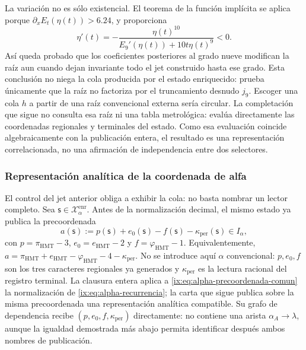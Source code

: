 La variación no es sólo existencial. El teorema de la función implícita se
aplica porque \(\partial_xE_t(\eta(t))>6.24\), y proporciona
\begin{equation}
 \eta'(t)=-
 \frac{\eta(t)^{10}}
 {E_9'(\eta(t))+10t\eta(t)^9}<0.
 \label{ix:eq:alpha-variacion-raiz-prolongacion}
\end{equation}
Así queda probado que los coeficientes posteriores al grado nueve modifican
la raíz aun cuando dejan invariante todo el jet construido hasta ese grado.
Esta conclusión no niega la cola producida por el estado enriquecido: prueba
únicamente que la raíz no factoriza por el truncamiento desnudo
\(j_9\). Escoger una cola \(h\) a partir de una raíz convencional externa
sería circular. La completación que sigue no consulta esa raíz ni una tabla
metrológica: evalúa directamente las coordenadas regionales y terminales del
estado. Como esa evaluación coincide algebraicamente con la publicación
entera, el resultado es una representación correlacionada, no una afirmación
de independencia entre dos selectores.


\subsubsection{Representación analítica de la coordenada de alfa}
\label{ix:subsec:alpha-lector-completo-rev08}

El control del jet anterior obliga a exhibir la cola: no basta nombrar un
lector completo. Sea \(\mathsf s\in\mathcal X_\alpha^{\mathrm{enr}}\). Antes
de la normalización decimal, el mismo estado ya publica la precoordenada
\begin{equation}
 a(\mathsf s):=p(\mathsf s)+e_0(\mathsf s)-f(\mathsf s)
                 -\kappa_{\mathrm{per}}(\mathsf s)\in I_\alpha,
 \label{ix:eq:alpha-precoordenada-comun}
\end{equation}
con \(p=\pi_{\mathrm{HMT}}-3\),
\(e_0=e_{\mathrm{HMT}}-2\) y
\(f=\varphi_{\mathrm{HMT}}-1\). Equivalentemente,
\(a=\pi_{\mathrm{HMT}}+e_{\mathrm{HMT}}-
\varphi_{\mathrm{HMT}}-4-\kappa_{\mathrm{per}}\). No se introduce aquí
\(\alpha\) convencional: \(p,e_0,f\) son los tres caracteres regionales ya
generados y \(\kappa_{\mathrm{per}}\) es la lectura racional del registro
terminal. La clausura entera aplica a
\eqref{ix:eq:alpha-precoordenada-comun} la normalización de
\eqref{ix:eq:alpha-recurrencia}; la carta que sigue publica sobre la misma
precoordenada una representación analítica compatible. Su grafo de
dependencia recibe \((p,e_0,f,\kappa_{\mathrm{per}})\) directamente: no
contiene una arista \(\alpha_A\to\lambda\), aunque la igualdad demostrada más
abajo permita identificar después ambos nombres de publicación.

